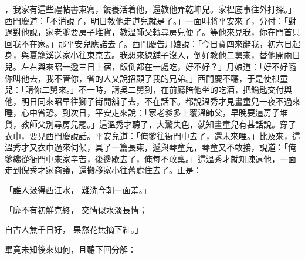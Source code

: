 \begin{showcontents}{}
，我家有這些禮帖書柬寫，饒養活着他，還教他弄乾坤兒。家裡底事往外打探。」西門慶道：「不消說了，明日教他走道兒就是了。」一面叫將平安來了，分付：「對過對他說，家老爹要房子堆貨，教溫師父轉尋房兒便了。等他來見我，你在門首只回我不在家。」那平安兒應諾去了。西門慶告月娘說：「今日賁四來辭我，初六日起身，與夏籠溪送家小往東京去。我想來線舖子沒人，倒好教他二舅來，替他開兩日兒。左右與來昭一遞三日上宿，飯倒都在一處吃，好不好？」月娘道：「好不好隨你叫他去，我不管你，省的人又說招顧了我的兄弟。」西門慶不聽，于是使棋童兒：「請你二舅來。」不一時，請吳二舅到，在前廳陪他坐的吃酒，把鑰匙交付與他，明日同來昭早往獅子街開舖子去，不在話下。都說溫秀才見畫童兒一夜不過來睡，心中省恐。到次日，平安走來說：「家老爹多上覆溫師父，早晚要這房子堆貨，教師父別尋房兒罷。」這溫秀才聽了，大驚失色，就知畫童兒有甚話說。穿了衣巾，要見西門慶說話。平安兒道：「俺爹往衙門中去了，還未來哩。」比及來，這溫秀才又衣巾過來伺候，具了一篇長柬，遞與琴童兒，琴童又不敢接，說道：「俺爹纔從衙門中來家辛苦，後邊歇去了，俺每不敢稟。」這溫秀才就知疎遠他，一面走到倪秀才家商議，還搬移家小往舊處住去了。正是：

「誰人汲得西江水，  難洗今朝一面羞。」

「靡不有初鮮克終，  交情似水淡長情；

自古人無千日好，  果然花無摘下紅。」

畢竟未知後來如何，且聽下回分解：





\end{showcontents}


